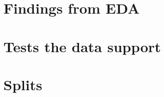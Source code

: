 \documentclass[11pt,a4paper]{article}
\begin{document}
\section{Findings from EDA}

\section{Tests the data support}

\section{Splits}
\end{document}
